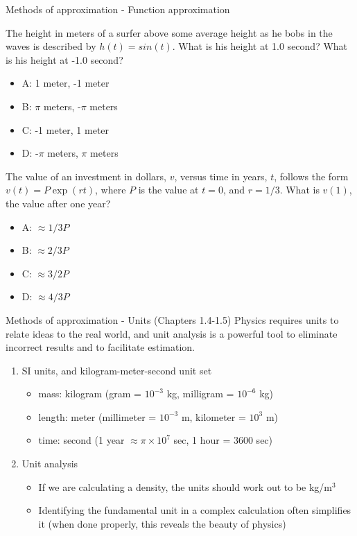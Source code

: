 \documentclass{beamer}
\begin{document}
\begin{frame}{Methods of approximation - Function approximation}
\small
\begin{minipage}[b]{0.45\linewidth}
The height in meters of a surfer above some average height as he bobs in the waves is described by $h(t) = sin(t)$.  What is his height at 1.0 second?  What is his height at -1.0 second?
\vspace{0.2cm}
\begin{itemize}
\item A: 1 meter, -1 meter
\item B: $\pi$ meters, -$\pi$ meters
\item C: -1 meter, 1 meter
\item D: -$\pi$ meters, $\pi$ meters
\end{itemize}
\end{minipage}
\hspace{0.5cm}
\begin{minipage}[b]{0.45\linewidth}
The value of an investment in dollars, $v$, versus time in years, $t$, follows the form $v(t) = P\exp(rt)$, where $P$ is the value at $t=0$, and $r=1/3$.  What is $v(1)$, the value after one year?
\vspace{0.6cm}
\begin{itemize}
\item A: $\approx 1/3 P$
\item B: $\approx 2/3 P$
\item C: $\approx 3/2 P$
\item D: $\approx 4/3 P$
\end{itemize}
\end{minipage}
\end{frame}

\begin{frame}{Methods of approximation - Units (Chapters 1.4-1.5)}
Physics requires \alert{units} to relate ideas to the real world, and \alert{unit analysis} is a powerful tool to eliminate incorrect results and to facilitate estimation.
\begin{enumerate}
\item SI units, and kilogram-meter-second unit set
\begin{itemize}
\item mass: \alert{kilogram} (gram = $10^{-3}$ kg, milligram = $10^{-6}$ kg)
\item length: \alert{meter} (millimeter = $10^{-3}$ m, kilometer = $10^{3}$ m)
\item time: \alert{second} (1 year $\approx \pi \times 10^{7}$ sec, 1 hour = 3600 sec)
\end{itemize}
\item Unit analysis
\begin{itemize}
\item If we are calculating a density, the units should work out to be kg/m$^3$
\item Identifying the fundamental unit in a complex calculation often simplifies it (when done properly, this reveals the beauty of physics)
\end{itemize}
\end{enumerate}
\end{frame}
\end{document}
